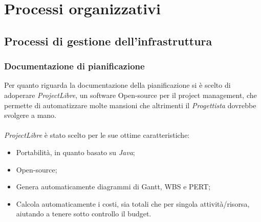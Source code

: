 \documentclass[a4paper]{article}
\begin{document}

	\newpage
	\section{Processi organizzativi}
	\subsection{Processi di gestione dell'infrastruttura}
	\subsubsection{Documentazione di pianificazione}
		Per quanto riguarda la documentazione della pianificazione si è scelto di adoperare
		\emph{ProjectLibre}, un software Open-source per il project management, che permette
		di automatizzare molte mansioni che altrimenti il \emph{Progettista} dovrebbe svolgere
		a mano. \\ \\
		\emph{ProjectLibre} è stato scelto per le sue ottime caratteristiche:
		\begin{itemize}
			\item Portabilità, in quanto basato su \emph{Java};
			\item Open-source;
			\item Genera automaticamente diagrammi di Gantt, WBS e PERT;
			\item Calcola automaticamente i costi, sia totali che per singola attività/risorsa,
			aiutando a tenere sotto controllo il budget.
		\end{itemize}
\end{document}
